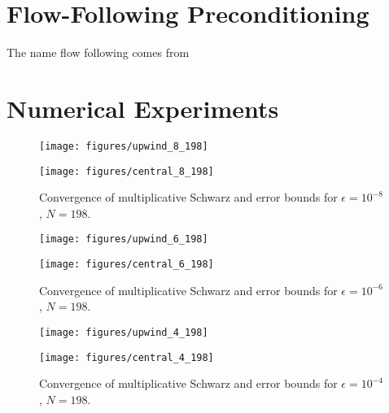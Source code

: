 \section{Flow-Following Preconditioning}
\label{1D:FlowFollowPrecon}
The name flow following comes from \cite{AndKop96}


\section{Numerical Experiments}
\label{1D:NumericsA}

\begin{figure}
\begin{minipage}[t]{0.49\linewidth}
\texttt{[image: figures/upwind\_8\_198]}
\end{minipage}
%
\begin{minipage}[t]{0.49\linewidth}
\texttt{[image: figures/central\_8\_198]}
\end{minipage}
\caption{Convergence of multiplicative Schwarz and error bounds for
$\epsilon=10^{-8}$, $N=198$.}
\label{fig:1D:MSM.N198.eps8}
\end{figure}

\begin{figure}
\begin{minipage}[t]{0.49\linewidth}
\texttt{[image: figures/upwind\_6\_198]}
\end{minipage}
%
\begin{minipage}[t]{0.49\linewidth}
\texttt{[image: figures/central\_6\_198]}
\end{minipage}
\caption{Convergence of multiplicative Schwarz and error bounds for
$\epsilon=10^{-6}$, $N=198$. }
\label{fig:1D:MSM.N198.eps6}
\end{figure}

\begin{figure}
\begin{minipage}[t]{0.49\linewidth}
\texttt{[image: figures/upwind\_4\_198]}
\end{minipage}
%
\begin{minipage}[t]{0.49\linewidth}
\texttt{[image: figures/central\_4\_198]}
\end{minipage}
\caption{Convergence of multiplicative Schwarz and error bounds for
$\epsilon=10^{-4}$, $N=198$. }
\label{fig:1D:MSM.N198.eps4}
\end{figure}

